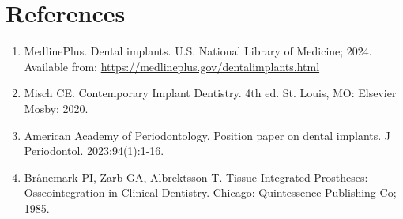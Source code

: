 \section*{References}
\begin{enumerate}
  \item MedlinePlus. Dental implants. U.S. National Library of Medicine; 2024. Available from: \url{https://medlineplus.gov/dentalimplants.html}
  
  \item Misch CE. Contemporary Implant Dentistry. 4th ed. St. Louis, MO: Elsevier Mosby; 2020.
  
  \item American Academy of Periodontology. Position paper on dental implants. J Periodontol. 2023;94(1):1-16.
  
  \item Br\aa{}nemark PI, Zarb GA, Albrektsson T. Tissue-Integrated Prostheses: Osseointegration in Clinical Dentistry. Chicago: Quintessence Publishing Co; 1985.
\end{enumerate}

\clearpage

